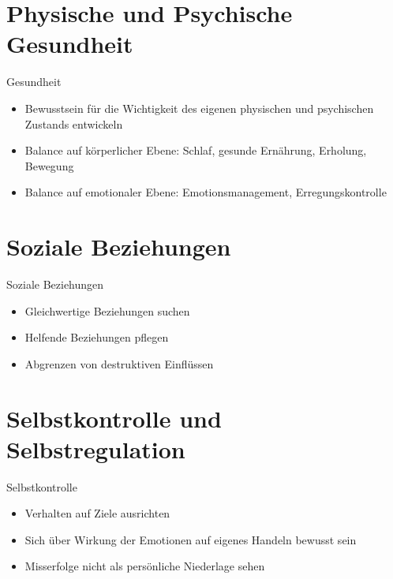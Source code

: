 \section{Physische und Psychische Gesundheit}

\begin{frame}[c]{Gesundheit}
    \begin{itemize}
    \item Bewusstsein für die Wichtigkeit des eigenen physischen und psychischen Zustands entwickeln \newline
    \pause
    \item Balance auf körperlicher Ebene: \pause Schlaf\pause, gesunde Ernährung\pause, Erholung\pause, Bewegung \newline
    \pause
    \item Balance auf emotionaler Ebene: \pause Emotionsmanagement\pause, Erregungskontrolle
    \end{itemize}
\end{frame}



\section{Soziale Beziehungen}

\begin{frame}[c]{Soziale Beziehungen}
    \begin{itemize}
    \item Gleichwertige Beziehungen suchen \newline
    \pause
    \item Helfende Beziehungen pflegen \newline
    \pause
    \item Abgrenzen von destruktiven Einflüssen
    \end{itemize}
\end{frame}



\section{Selbstkontrolle und Selbstregulation}

\begin{frame}[c]{Selbstkontrolle}
    \begin{itemize}
    \item Verhalten auf Ziele ausrichten \newline
    \pause
    \item Sich über Wirkung der Emotionen auf eigenes Handeln bewusst sein \newline
    \pause
    \item Misserfolge nicht als persönliche Niederlage sehen
    \end{itemize}
\end{frame}



